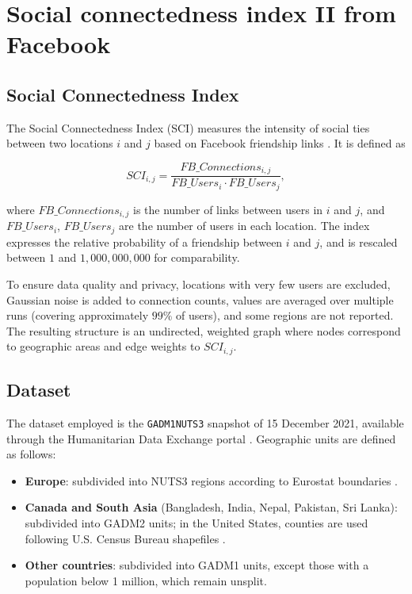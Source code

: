 \chapter{Social connectedness index II from Facebook}


\section{Social Connectedness Index}
The Social Connectedness Index (SCI) measures the intensity of social ties between two locations $i$ and $j$ based on Facebook friendship links \cite{facebookSCI}. It is defined as

\begin{equation}
    SCI_{i,j} = \frac{FB\_Connections_{i,j}}{FB\_Users_i \cdot FB\_Users_j},
\end{equation}

where $FB\_Connections_{i,j}$ is the number of links between users in $i$ and $j$, and $FB\_Users_i$, $FB\_Users_j$ are the number of users in each location.  
The index expresses the relative probability of a friendship between $i$ and $j$, and is rescaled between $1$ and $1{,}000{,}000{,}000$ for comparability.  

To ensure data quality and privacy, locations with very few users are excluded, Gaussian noise is added to connection counts, values are averaged over multiple runs (covering approximately $99\%$ of users), and some regions are not reported.  
The resulting structure is an undirected, weighted graph where nodes correspond to geographic areas and edge weights to $SCI_{i,j}$.

\section{Dataset}
The dataset employed is the \texttt{GADM1NUTS3} snapshot of 15 December 2021, available through the Humanitarian Data Exchange portal \cite{facebookSCI}.  
Geographic units are defined as follows:  
\begin{itemize}
    \item \textbf{Europe}: subdivided into NUTS3 regions according to Eurostat boundaries \cite{eurostatNUTS}.  
    \item \textbf{Canada and South Asia} (Bangladesh, India, Nepal, Pakistan, Sri Lanka): subdivided into GADM2 units; in the United States, counties are used following U.S. Census Bureau shapefiles \cite{uscensusCounties}.  
    \item \textbf{Other countries}: subdivided into GADM1 units, except those with a population below 1 million, which remain unsplit.  
\end{itemize}

